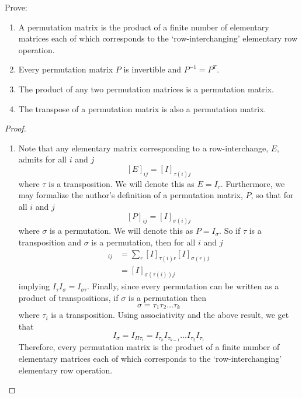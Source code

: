 \begin{problem} \label{P.1.17}
    Prove:
    \begin{enumerate}
        \item A permutation matrix is the product of a finite number of elementary matrices each of which corresponds to the `row-interchanging' elementary row operation.
        
        \item Every permutation matrix \( P \) is invertible and \( P^{-1} = P^T \).
        
        \item The product of any two permutation matrices is a permutation matrix.
        
        \item The transpose of a permutation matrix is also a permutation matrix.
    \end{enumerate}
    
    \begin{proof}
        \begin{enumerate}
            \item Note that any elementary matrix corresponding to a row-interchange, \( E \), admits for all \( i \) and \( j \)
            \[
            [E]_{ij} = [I]_{\tau(i)j}
            \]
            where \( \tau \) is a transposition. We will denote this as \( E = I_\tau \). Furthermore, we may formalize the author's definition of a permutation matrix, \( P \), so that for all \( i \) and \(j \)
            \[
            [P]_{ij} = [I]_{\sigma(i)j}
            \]
            where \( \sigma \) is a permutation. We will denote this as \( P = I_\sigma \). So if \( \tau \) is a transposition and \( \sigma \) is a permutation, then for all \( i \) and \( j \)
            \begin{align*}
                [I_\tau I_\sigma]_{ij} &= \sum_{r} [I]_{\tau(i)r}[I]_{\sigma(r)j} \\
                &= [I]_{\sigma(\tau(i))j}
            \end{align*}
            implying \( I_\tau I_\sigma = I_{\sigma \tau} \). Finally, since every permutation can be written as a product of transpositions, if \( \sigma \) is a permutation then
            \[
            \sigma = \tau_1 \tau_2 \ldots \tau_k
            \]
            where \( \tau_i \) is a transposition. Using associativity and the above result, we get that
            \[
            I_\sigma = I_{\Pi \tau_i} = I_{\tau_k}I_{\tau_{k-1}}\ldots I_{\tau_2}I_{\tau_1}
            \]
            Therefore, every permutation matrix is the product of a finite number of elementary matrices each of which corresponds to the `row-interchanging' elementary row operation.
            

\end{enumerate}
\end{proof}
\end{problem}
